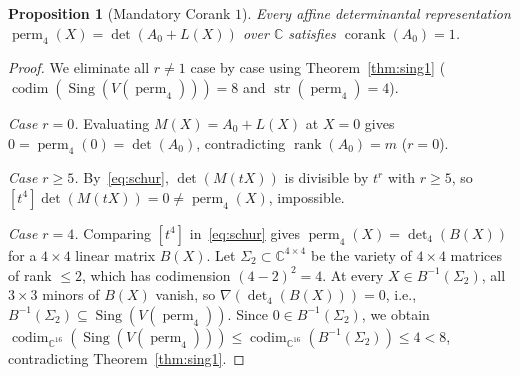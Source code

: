 \documentclass[11pt,a4paper]{article}
\newtheorem{proposition}[theorem]{Proposition}
\theoremstyle{definition}
\DeclareMathOperator{\perm}{perm}
\DeclareMathOperator{\codim}{codim}
\DeclareMathOperator{\Sing}{Sing}
\DeclareMathOperator{\rank}{rank}
\DeclareMathOperator{\corank}{corank}
\DeclareMathOperator{\str}{str}
\begin{document}
\begin{proposition}[Mandatory Corank $1$]\label{prop:corank1}
Every affine determinantal representation $\perm_4(X) = \det(A_0 + L(X))$ over $\mathbb{C}$ satisfies $\corank(A_0) = 1$.
\end{proposition}

\begin{proof}
We eliminate all $r \neq 1$ case by case using Theorem~\ref{thm:sing1} ($\codim(\Sing(V(\perm_4))) = 8$ and $\str(\perm_4) = 4$).

\emph{Case $r = 0$.} Evaluating $M(X) = A_0 + L(X)$ at $X = 0$ gives $0 = \perm_4(0) = \det(A_0)$, contradicting $\rank(A_0) = m$ ($r = 0$).

\emph{Case $r \ge 5$.} By~\eqref{eq:schur}, $\det(M(tX))$ is divisible by $t^r$ with $r \ge 5$, so $[t^4]\det(M(tX)) = 0 \neq \perm_4(X)$, impossible.

\emph{Case $r = 4$.} Comparing $[t^4]$ in~\eqref{eq:schur} gives $\perm_4(X) = \det_4(B(X))$ for a $4\times 4$ linear matrix $B(X)$. Let $\Sigma_2 \subset \mathbb{C}^{4\times 4}$ be the variety of $4\times 4$ matrices of rank $\le 2$, which has codimension $(4-2)^2 = 4$. At every $X \in B^{-1}(\Sigma_2)$, all $3\times 3$ minors of $B(X)$ vanish, so $\nabla(\det_4(B(X))) = 0$, i.e., $B^{-1}(\Sigma_2) \subseteq \Sing(V(\perm_4))$. Since $0 \in B^{-1}(\Sigma_2)$, we obtain $\codim_{\mathbb{C}^{16}}(\Sing(V(\perm_4))) \le \codim_{\mathbb{C}^{16}}(B^{-1}(\Sigma_2)) \le 4 < 8$, contradicting Theorem~\ref{thm:sing1}.


\end{proof}
\end{document}
